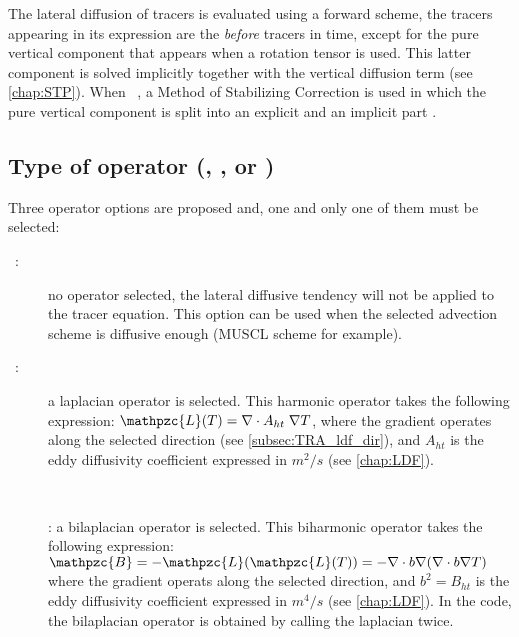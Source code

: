 \documentclass[../main/NEMO_manual]{subfiles}
\begin{document}
The lateral diffusion of tracers is evaluated using a forward scheme,
\ie the tracers appearing in its expression are the \textit{before} tracers in time,
except for the pure vertical component that appears when a rotation tensor is used.
This latter component is solved implicitly together with the vertical diffusion term (see \autoref{chap:STP}).
When ~, a Method of Stabilizing Correction is used in which
the pure vertical component is split into an explicit and an implicit part \citep{Lemarie_OM2012}.

\subsection[Type of operator (\protect\np{ln\_traldf}\{\_NONE,\_lap,\_blp\}\})]{Type of operator (\protect{}, \protect{}, or \protect{}) } 
\label{subsec:TRA_ldf_op}

Three operator options are proposed and, one and only one of them must be selected:

\begin{description}
\item[~:]
  no operator selected, the lateral diffusive tendency will not be applied to the tracer equation.
  This option can be used when the selected advection scheme is diffusive enough (MUSCL scheme for example).
\item[~:]
  a laplacian operator is selected.
  This harmonic operator takes the following expression:  $\mathpzc{L}(T) = \nabla \cdot A_{ht} \; \nabla T $,
  where the gradient operates along the selected direction (see \autoref{subsec:TRA_ldf_dir}),
  and $A_{ht}$ is the eddy diffusivity coefficient expressed in $m^2/s$ (see \autoref{chap:LDF}).
\item[~]:
  a bilaplacian operator is selected.
  This biharmonic operator takes the following expression:
  $\mathpzc{B} = - \mathpzc{L}(\mathpzc{L}(T)) = - \nabla \cdot b \nabla (\nabla \cdot b \nabla T)$
  where the gradient operats along the selected direction,
  and $b^2 = B_{ht}$ is the eddy diffusivity coefficient expressed in $m^4/s$ (see \autoref{chap:LDF}).
  In the code, the bilaplacian operator is obtained by calling the laplacian twice.
\end{description}
\end{document}
